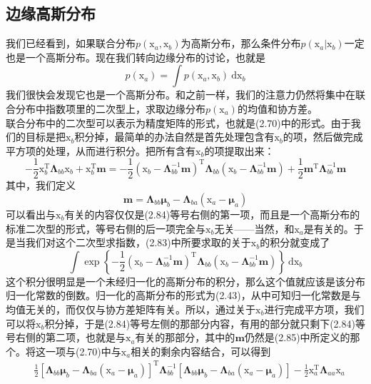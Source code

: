 \documentclass[b5paper]{book}
\numberwithin{equation}{chapter}
\newcommand {\bx} {\boldsymbol{\mathrm{x}}}
\newcommand {\rmT} {\mathrm{T}}
\newcommand {\bfMu} {\boldsymbol{\mu}}
\newcommand {\bfLambda} {\boldsymbol{\Lambda}}
\begin{document}
	\subsection{边缘高斯分布}
	\textnormal{
	我们已经看到，如果联合分布$p(\bx_a, \bx_b)$为高斯分布，那么条件分布$p(\bx_a|\bx_b)$一定也是一个高斯分布。现在我们转向边缘分布的讨论，也就是
	\begin{equation}
		p(\bx_a)=\int p(\bx_a,\bx_b)\ \mathrm{d}\bx_b
	\end{equation}
	我们很快会发现它也是一个高斯分布。和之前一样，我们的注意力仍然将集中在联合分布中指数项里的二次型上，求取边缘分布$p(\bx_a)$的均值和协方差。\\
	\indent 联合分布中的二次型可以表示为精度矩阵的形式，也就是(2.70)中的形式。由于我们的目标是把$\bx_b$积分掉，最简单的办法自然是首先处理包含有$\bx_b$的项，然后做完成平方项的处理，从而进行积分。把所有含有$\bx_b$的项提取出来：
	\begin{equation}
		-\frac{1}{2}\bx_b^{\rmT}\bfLambda_{bb}\bx_b+\bx_b^{\rmT}\mathbf{m}=-\frac{1}{2}(\bx_b-\bfLambda_{bb}^{-1}\mathbf{m})^{\rmT}\bfLambda_{bb}(\bx_b-\bfLambda_{bb}^{-1}\mathbf{m})+\frac{1}{2}\mathbf{m}^{\rmT}\bfLambda_{bb}^{-1}\mathbf{m}
	\end{equation}
	其中，我们定义
	\begin{equation}
		\mathbf{m}=\bfLambda_{bb}\bfMu_{b}-\bfLambda_{ba}(\bx_a-\bfMu_a)
	\end{equation}
	可以看出与$\bx_b$有关的内容仅仅是(2.84)等号右侧的第一项，而且是一个高斯分布的标准二次型的形式，等号右侧的后一项完全与$\bx_b$无关——当然，和$\bx_a$是有关的。于是当我们对这个二次型求指数，(2.83)中所要求取的关于$\bx_b$的积分就变成了
	\begin{equation}
		\int \exp\left\{-\frac{1}{2}(\bx_b-\bfLambda_{bb}^{-1}\mathbf{m})^{\rmT}\bfLambda_{bb}(\bx_b-\bfLambda_{bb}^{-1}\mathbf{m})\right\}\ \mathrm{d}\bx_b
	\end{equation}
	这个积分很明显是一个未经归一化的高斯分布的积分，那么这个值就应该是该分布归一化常数的倒数。归一化的高斯分布的形式为(2.43)，从中可知归一化常数是与均值无关的，而仅仅与协方差矩阵有关。所以，通过关于$\bx_b$进行完成平方项，我们可以将$\bx_b$积分掉，于是(2.84)等号左侧的那部分内容，有用的部分就只剩下(2.84)等号右侧的第二项，也就是与$\bx_a$有关的那部分，其中的$\mathbf{m}$仍然是(2.85)中所定义的那个。将这一项与(2.70)中与$\bx_a$相关的剩余内容结合，可以得到
	\begin{equation}
	\begin{split}
		&\frac{1}{2}[\bfLambda_{bb}\bfMu_b-\bfLambda_{ba}(\bx_a-\bfMu_a)]^{\rmT}\bfLambda_{bb}^{-1}[\bfLambda_{bb}\bfMu_{b}-\bfLambda_{ba}(\bx_a-\bfMu_a)]-\frac{1}{2}\bx_a^{\rmT}\bfLambda_{aa}\bx_a\\

\end{split}
\end{equation}}
\end{document}
